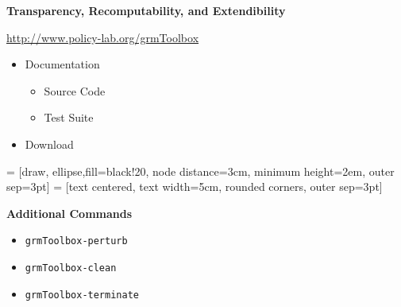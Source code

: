 \begin{frame}
\textbf{Transparency, Recomputability, and Extendibility}

\begin{center}\Large
\href{http://www.policy-lab.org/grmToolbox}{http://www.policy-lab.org/grmToolbox}
\end{center}

\begin{itemize}
\item Documentation\vspace{0.2cm}
\begin{itemize}
\item Source Code\vspace{0.2cm}
\item Test Suite\vspace{0.2cm}
\end{itemize}
\item Download
\end{itemize}

\end{frame}






	\begin{frame}[fragile]
		\begin{center}
		 = [draw, ellipse,fill=black!20, node distance=3cm,
    minimum height=2em, outer sep=3pt]
		 = [text centered, text width=5cm,
	     rounded corners, outer sep=3pt]

		\end{center}
	\end{frame}

\begin{frame}[fragile]
\textbf{Additional Commands}\vspace{0.3cm}
\begin{itemize}
\item \verb+grmToolbox-perturb+\vspace{0.2cm}
\item \verb+grmToolbox-clean+\vspace{0.2cm}
\item \verb+grmToolbox-terminate+
\end{itemize}
\end{frame}
